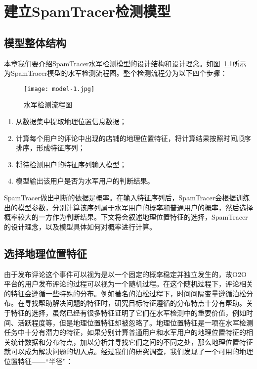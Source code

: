 
\chapter{建立SpamTracer检测模型}
\label{chap:model}


\section{模型整体结构}

本章我们要介绍SpamTracer水军检测模型的设计结构和设计理念。如图~\ref{fig:structure}所示为SpamTracer模型的水军检测流程图。整个检测流程分为以下四个步骤：

\begin{figure}[htbp]
	\centering
	\begin{minipage}[htbp]{\textwidth}
		\centering
		\texttt{[image: model-1.jpg]}
		\caption[水军检测流程图]
		{水军检测流程图\label{fig:structure}}		
	\end{minipage}     
\end{figure}

\begin{enumerate}
	\item[(1)] 从数据集中提取地理位置信息数据；
	\item[(2)] 计算每个用户的评论中出现的店铺的地理位置特征，将计算结果按照时间顺序排序，形成特征序列；
	\item[(3)] 将待检测用户的特征序列输入模型；
	\item[(4)] 模型输出该用户是否为水军用户的判断结果。
\end{enumerate}

SpamTracer做出判断的依据是概率。在输入特征序列后，SpamTracer会根据训练出的模型参数，分别计算该序列属于水军用户的概率和普通用户的概率，然后选择概率较大的一方作为判断结果。下文将会叙述地理位置特征的选择，SpamTracer的设计理念，以及模型具体如何对概率进行计算。


\section{选择地理位置特征}

由于发布评论这个事件可以视为是以一个固定的概率稳定并独立发生的，故O2O平台的用户发布评论的过程可以视为一个随机过程。在这个随机过程下，评论相关的特征会遵循一些特殊的分布。例如著名的泊松过程下，时间间隔变量遵循泊松分布。在寻找帮助解决问题的特征时，研究目标特征遵循的分布特点十分有帮助。关于特征的选择，虽然已经有很多特征证明了它们在水军检测中的重要价值，例如时间、活跃程度等，但是地理位置特征却被忽略了。地理位置特征是一项在水军检测任务中十分有潜力的特征，如果分别计算普通用户和水军用户的地理位置特征的相关统计数据和分布特点，加以分析并寻找它们之间的不同之处，那么地理位置特征就可以成为解决问题的切入点。经过我们的研究调查，我们发现了一个可用的地理位置特征——“半径”：

